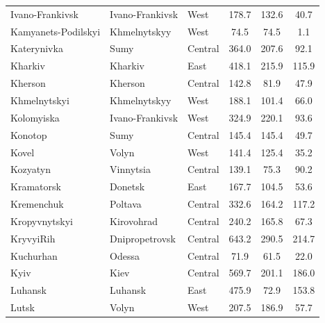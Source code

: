 \documentclass[sn-basic]{sn-jnl}%
\begin{document}
{\begin{appendices}
\begin{longtable}{lllccc}
Ivano-Frankivsk     & Ivano-Frankivsk & West    & 178.7                                & 132.6 & 40.7      \\
Kamyanets-Podilskyi & Khmelnytskyy    & West    & 74.5                                 & 74.5  & 1.1       \\
Katerynivka         & Sumy            & Central & 364.0                                & 207.6 & 92.1      \\
Kharkiv             & Kharkiv         & East    & 418.1                                & 215.9 & 115.9     \\
Kherson             & Kherson         & Central & 142.8                                & 81.9  & 47.9      \\
Khmelnytskyi        & Khmelnytskyy    & West    & 188.1                                & 101.4 & 66.0      \\
Kolomyiska          & Ivano-Frankivsk & West    & 324.9                                & 220.1 & 93.6      \\
Konotop             & Sumy            & Central & 145.4                                & 145.4 & 49.7      \\
Kovel               & Volyn           & West    & 141.4                                & 125.4 & 35.2      \\
Kozyatyn            & Vinnytsia       & Central & 139.1                                & 75.3  & 90.2      \\
Kramatorsk          & Donetsk         & East    & 167.7                                & 104.5 & 53.6      \\
Kremenchuk          & Poltava         & Central & 332.6                                & 164.2 & 117.2     \\
Kropyvnytskyi       & Kirovohrad      & Central & 240.2                                & 165.8 & 67.3      \\
KryvyiRih           & Dnipropetrovsk  & Central & 643.2                                & 290.5 & 214.7     \\
Kuchurhan           & Odessa          & Central & 71.9                                 & 61.5  & 22.0      \\
Kyiv                & Kiev            & Central & 569.7                                & 201.1 & 186.0     \\
Luhansk             & Luhansk         & East    & 475.9                                & 72.9  & 153.8     \\
Lutsk               & Volyn           & West    & 207.5                                & 186.9 & 57.7      \\

\end{longtable}
\end{appendices}}
\end{document}
